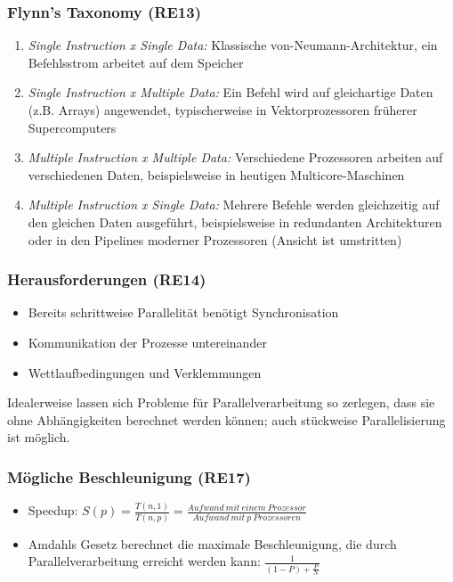 \subsubsection{Flynn's Taxonomy (RE13)}
\begin{enumerate}
	\item \textit{Single Instruction x Single Data:} Klassische von-Neumann-Architektur, ein Befehlsstrom arbeitet auf dem Speicher
	\item \textit{Single Instruction x Multiple Data:} Ein Befehl wird auf gleichartige Daten (z.B. Arrays) angewendet, typischerweise in Vektorprozessoren früherer Supercomputers
	\item \textit{Multiple Instruction x Multiple Data:} Verschiedene Prozessoren arbeiten auf verschiedenen Daten, beispielsweise in heutigen Multicore-Maschinen
	\item \textit{Multiple Instruction x Single Data:} Mehrere Befehle werden gleichzeitig auf den gleichen Daten ausgeführt, beispielsweise in redundanten Architekturen oder in den Pipelines moderner Prozessoren (Ansicht ist umstritten)
\end{enumerate}

\subsubsection{Herausforderungen (RE14)}
\begin{itemize}
	\item Bereits schrittweise Parallelität benötigt Synchronisation
	\item Kommunikation der Prozesse untereinander
	\item Wettlaufbedingungen und Verklemmungen
\end{itemize}
Idealerweise lassen sich Probleme für Parallelverarbeitung so zerlegen, dass sie ohne Abhängigkeiten berechnet werden können; auch stückweise Parallelisierung ist möglich.

\subsubsection{Mögliche Beschleunigung (RE17)}
\begin{itemize}
	\item Speedup: \(S(p) = \frac{T(n,1)}{T(n,p)} = \frac{Aufwand~mit~einem~Prozessor}{Aufwand~mit~p~Prozessoren}\)
	\item Amdahls Gesetz berechnet die maximale Beschleunigung, die durch Parallelverarbeitung erreicht werden kann: \(\frac{1}{(1-P)+\frac{P}{N}}\)
\end{itemize}


